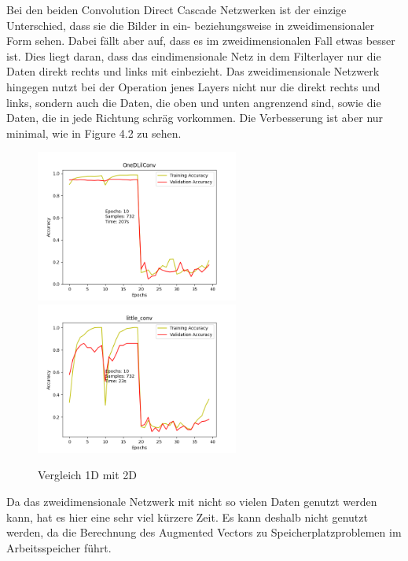 Bei den beiden Convolution Direct Cascade Netzwerken ist der einzige Unterschied, dass sie die Bilder in ein- beziehungsweise in 
zweidimensionaler Form sehen. Dabei fällt aber auf, dass es im zweidimensionalen Fall etwas besser ist. 
Dies liegt daran, dass das eindimensionale Netz in dem Filterlayer nur die Daten direkt rechts und links mit einbezieht. Das 
zweidimensionale Netzwerk hingegen nutzt bei der Operation jenes Layers nicht nur die direkt rechts und links, sondern auch die Daten, 
die oben und unten angrenzend sind, sowie die Daten, die in jede Richtung schräg vorkommen. 
Die Verbesserung ist aber nur minimal, wie in Figure 4.2 zu sehen. 

\begin{figure}[htpb]
    \includegraphics[height=5cm]{../../Plots/ba_plots/timing/1DConv.png}
    \includegraphics[height=5cm]{../../Plots/ba_plots/timing/2DConv.png}
    \caption{\label{fig:dim} Vergleich 1D mit 2D}
\end{figure}

Da das zweidimensionale Netzwerk mit nicht so vielen Daten genutzt werden kann, hat es hier eine sehr viel kürzere Zeit. Es kann deshalb 
nicht genutzt werden, da die Berechnung des Augmented Vectors zu Speicherplatzproblemen im Arbeitsspeicher führt. 